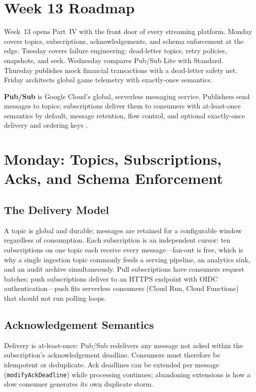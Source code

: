 \section{Week 13 Roadmap}
Week~13 opens Part~IV with the front door of every streaming platform. Monday covers topics, subscriptions, acknowledgements, and schema enforcement at the edge. Tuesday covers failure engineering: dead-letter topics, retry policies, snapshots, and seek. Wednesday compares Pub/Sub Lite with Standard. Thursday publishes mock financial transactions with a dead-letter safety net. Friday architects global game telemetry with exactly-once semantics.

\begin{definitionbox}
\textbf{Pub/Sub} is Google Cloud's global, serverless messaging service. Publishers send messages to topics; subscriptions deliver them to consumers with at-least-once semantics by default, message retention, flow control, and optional exactly-once delivery and ordering keys \cite{googlecloudpubsubdocs}.
\end{definitionbox}

\section{Monday: Topics, Subscriptions, Acks, and Schema Enforcement}

\subsection{The Delivery Model}
A topic is global and durable; messages are retained for a configurable window regardless of consumption. Each subscription is an independent cursor: ten subscriptions on one topic each receive every message---fan-out is free, which is why a single ingestion topic commonly feeds a serving pipeline, an analytics sink, and an audit archive simultaneously. Pull subscriptions have consumers request batches; push subscriptions deliver to an HTTPS endpoint with OIDC authentication---push fits serverless consumers (Cloud Run, Cloud Functions) that should not run polling loops.

\subsection{Acknowledgement Semantics}
Delivery is at-least-once: Pub/Sub redelivers any message not acked within the subscription's acknowledgement deadline. Consumers must therefore be idempotent or deduplicate. Ack deadlines can be extended per message (\texttt{modifyAckDeadline}) while processing continues; abandoning extensions is how a slow consumer generates its own duplicate storm.

